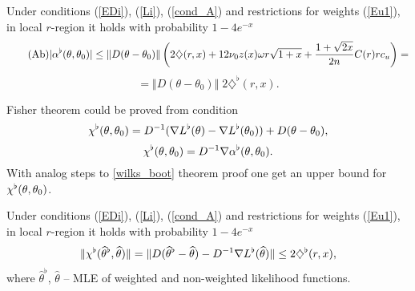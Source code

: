\begin{theorem}
\label{wilks_boot}
Under conditions (\ref{EDi}), (\ref{Li}), (\ref{cond_A}) and restrictions for weights (\ref{Eu1}), in local $r$-region it holds with probability $1 - 4 e^{-x}$
\[\tag{Ab}
| \alphab12 |
\leq 
\Vert D (\theta - \theta_0)  \Vert
\left(
2 \diamondsuit(r,x) + 12 \nu_0  z(x) \omega r  \sqrt{1+x} + 
\frac{1 + \sqrt{2x}}{2n}  C(r) r c_u
\right)  = 
\]
\[
 = \Vert D (\theta - \theta_0)  \Vert \; 2 \diamondsuit^{\flat}(r,x). 
\] 
\end{theorem}
Fisher theorem could be proved from condition
\[
\chib12 =  D^{-1} ( \nabla L^{\flat}(\theta) -   \nabla L^{\flat}(\theta_0) ) + D (\theta -  \theta_0),
\] 
\[
\chib12 = D^{-1} \nabla \alphab12. 
\]
With analog steps to \ref{wilks_boot} theorem proof one get an upper bound for $\chib12$.
\begin{theorem}
\label{fisher_boot}
Under conditions (\ref{EDi}), (\ref{Li}), (\ref{cond_A}) and restrictions for weights (\ref{Eu1}), in local $r$-region it holds with probability $1 - 4 e^{-x}$
\[
\Vert \chi^{\flat}(\widehat{\theta}^{\flat}, \widehat{\theta}) \Vert
= 
\Vert  D (\widehat{\theta}^{\flat} -  \widehat{\theta}) -  D^{-1} \nabla L^{\flat}(\widehat{\theta}) \Vert
\leq 
 2 \diamondsuit^{\flat}(r,x), 
\] 
where $\widehat{\theta}^{\flat}$, $\widehat{\theta}$ -- MLE of weighted and non-weighted likelihood functions.
\end{theorem}
